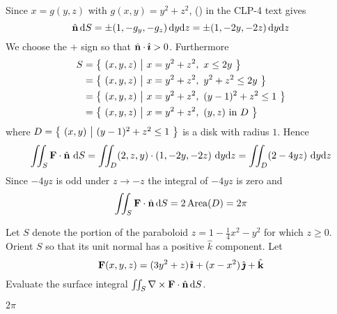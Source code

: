 \begin{solution} 
Since $x=g(y,z)$ with $g(x,y)=y^2+z^2$, 
() in the CLP-4 text gives 
\begin{equation*}
\hat{\mathbf{n}}\,\mathrm{d}S=\pm (1,-g_y,-g_z)\,\mathrm{d}y\mathrm{d}z
=\pm (1,-2y,-2z)\,\mathrm{d}y\mathrm{d}z
\end{equation*} 
We choose the $+$ sign so that $\hat{\mathbf{n}} \cdot \hat{\pmb{\imath}} > 0$. Furthermore 
\begin{align*}
S&=\big\{ \ (x,y,z)\ \big|\ x=y^2+z^2,\ x\le 2y\ \big\} \\
&=\big\{ \ (x,y,z)\ \big|\ x=y^2+z^2,\ y^2+z^2\le 2y\ \big\} \\
&=\big\{ \ (x,y,z)\ \big|\ x=y^2+z^2,\ (y-1)^2+z^2\le 1\ \big\} \\
&=\big\{ \ (x,y,z)\ \big|\ x=y^2+z^2,\ (y,z)\text{ in }D\ \big\}
\end{align*}
where $D=\big\{ \ (x,y)\ \big|\ (y-1)^2+z^2\le 1\ \big\}$ is a disk with radius $1$. Hence
$$
\iint_S \mathbf{F} \cdot \hat{\mathbf{n}}\ \mathrm{d}S
 = \iint_D (2, z, y) \cdot  (1,-2 y, -2z)\ \mathrm{d}y \mathrm{d}z
 = \iint_D (2 - 4yz)\ \mathrm{d}y \mathrm{d}z
$$
Since $-4yz$ is odd under $z\rightarrow -z$ the integral of $-4yz$ is zero and
\begin{equation*}
\iint_S \mathbf{F} \cdot \hat{\mathbf{n}}\, \mathrm{d}S= 2\,\text{Area}(D)=2\pi
\end{equation*}
\end{solution}


\begin{question}[M317 2001D] %
Let $S$ denote the portion of the paraboloid 
$z=1-\frac{1}{4}x^2-y^2$ for which $z\ge 0$. Orient $S$ so that its unit
normal has a positive $\hat k$ component. Let
$$
\mathbf{F}(x,y,z) = (3y^2+z)\,\hat{\pmb{\imath}}+(x-x^2)\,\hat{\pmb{\jmath}}+\hat{\mathbf{k}} 
$$
Evaluate the surface integral $\iint_S\nabla\times\mathbf{F}\cdot\hat{\mathbf{n}}\,\mathrm{d}S$.
\end{question}


\begin{answer} 
$2\pi$
\end{answer}

